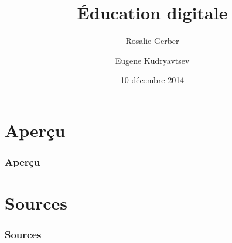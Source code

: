 \documentclass{beamer}
\title{Éducation digitale}
\author[Rosalie G. \and Eugene K.]{Rosalie Gerber \and Eugene Kudryavtsev}
\date{10 décembre 2014}
\institute[]{Haute école spécialisée bernoise}
\begin{document}
    \begin{frame}
        \titlepage
    \end{frame}

    \section*{Aperçu}
    \begin{frame}
        \frametitle{Aperçu}
        \tableofcontents
    \end{frame}

    \section*{Sources}
    \begin{frame}
        \frametitle{Sources}
    \end{frame}
    
\end{document}
